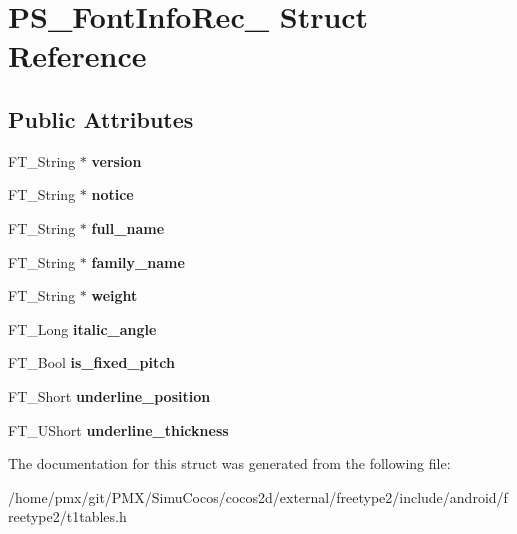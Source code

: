 \hypertarget{structPS__FontInfoRec__}{}\section{P\+S\+\_\+\+Font\+Info\+Rec\+\_\+ Struct Reference}
\label{structPS__FontInfoRec__}
\subsection*{Public Attributes}
\begin{DoxyCompactItemize}
\item 
\mbox{\label{structPS__FontInfoRec___a13d9158b67966191c90875340c7a7f79}} 
F\+T\+\_\+\+String $\ast$ {\bfseries version}
\item 
\mbox{\label{structPS__FontInfoRec___aa5c7d1662b6569842ed81775cabcd379}} 
F\+T\+\_\+\+String $\ast$ {\bfseries notice}
\item 
\mbox{\label{structPS__FontInfoRec___a97af6eeb4cd76fff5b9c5dbba5d4efe3}} 
F\+T\+\_\+\+String $\ast$ {\bfseries full\+\_\+name}
\item 
\mbox{\label{structPS__FontInfoRec___abe6150b7825cfd5da88d79cd794b8076}} 
F\+T\+\_\+\+String $\ast$ {\bfseries family\+\_\+name}
\item 
\mbox{\label{structPS__FontInfoRec___ac755bed14cd8eac2d3474a64fbaa95d5}} 
F\+T\+\_\+\+String $\ast$ {\bfseries weight}
\item 
\mbox{\label{structPS__FontInfoRec___ab558a75a56fadd54dfc71dcbeec1375a}} 
F\+T\+\_\+\+Long {\bfseries italic\+\_\+angle}
\item 
\mbox{\label{structPS__FontInfoRec___a68e2d0913fe910ea86d558a4a426412a}} 
F\+T\+\_\+\+Bool {\bfseries is\+\_\+fixed\+\_\+pitch}
\item 
\mbox{\label{structPS__FontInfoRec___a772af52d17288d7846e8893e74d55212}} 
F\+T\+\_\+\+Short {\bfseries underline\+\_\+position}
\item 
\mbox{\label{structPS__FontInfoRec___a423904e811db5195485557bf0dccf126}} 
F\+T\+\_\+\+U\+Short {\bfseries underline\+\_\+thickness}
\end{DoxyCompactItemize}


The documentation for this struct was generated from the following file\+:\begin{DoxyCompactItemize}
\item 
/home/pmx/git/\+P\+M\+X/\+Simu\+Cocos/cocos2d/external/freetype2/include/android/freetype2/t1tables.\+h\end{DoxyCompactItemize}
